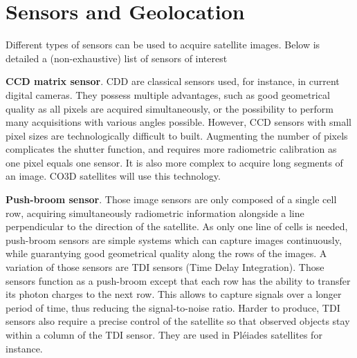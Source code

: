 \section{Sensors and Geolocation}\label{sec:sensors_rpc}
Different types of sensors can be used to acquire satellite images. Below is detailed a (non-exhaustive) list of sensors of interest \cite{cnes_imagerie_2008}

\textbf{CCD matrix sensor}. CDD are classical sensors used, for instance, in current digital cameras. They possess multiple advantages, such as good geometrical quality as all pixels are acquired simultaneously, or the possibility to perform many acquisitions with various angles possible. However, CCD sensors with small pixel sizes are technologically difficult to built. Augmenting the number of pixels complicates the shutter function, and requires more radiometric calibration as one pixel equals one sensor. It is also more complex to acquire long segments of an image. CO3D satellites will use this technology.

\textbf{Push-broom sensor}. Those image sensors are only composed of a single cell row, acquiring simultaneously radiometric information alongside a line perpendicular to the direction of the satellite. As only one line of cells is needed, push-broom sensors are simple systems which can capture images continuously, while guarantying good geometrical quality along the rows of the images. A variation of those sensors are TDI sensors (Time Delay Integration). Those sensors function as a push-broom except that each row has the ability to transfer its photon charges to the next row. This allows to capture signals over a longer period of time,  thus reducing the signal-to-noise ratio. Harder to produce, TDI sensors also require a precise control of the satellite so that observed objects stay within a column of the TDI sensor. They are used in Pléiades satellites for instance.

